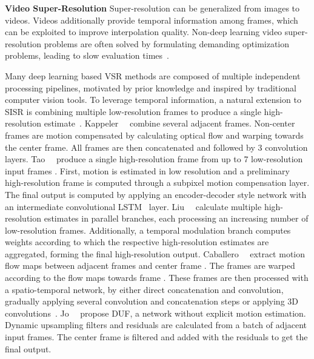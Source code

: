 \documentclass[10pt,twocolumn,letterpaper]{article}
\begin{document}
\noindent
\textbf{Video Super-Resolution}
\newline
Super-resolution can be generalized from images to videos. Videos additionally provide temporal information among frames, which can be exploited to improve interpolation quality. Non-deep learning video super-resolution problems are often solved by formulating demanding optimization problems, leading to slow evaluation times~\cite{belekos, farsiu, bayes}.

Many deep learning based VSR methods are composed of multiple independent processing pipelines, motivated by prior knowledge and inspired by traditional computer vision tools. To leverage temporal information, a natural extension to SISR is combining multiple low-resolution frames to produce a single high-resolution estimate~\cite{liao, endtoend, sparse_rep}. 
Kappeler~\etal~\cite{kappeler} combine several adjacent frames. Non-center frames are motion compensated by calculating optical flow and warping towards the center frame. All frames are then concatenated and followed by 3 convolution layers. 
Tao~\etal~\cite{tao} produce a single high-resolution frame  from up to 7 low-resolution input frames . First, motion is estimated in low resolution and a preliminary high-resolution frame is computed through a subpixel motion compensation layer. The final output is computed by applying an encoder-decoder style network with an intermediate convolutional LSTM~\cite{lstm} layer. 
Liu~\etal~\cite{liu} calculate multiple high-resolution estimates in parallel branches, each processing an increasing number of low-resolution frames. Additionally, a temporal modulation branch computes weights according to which the respective high-resolution estimates are aggregated, forming the final high-resolution output.
Caballero~\etal~\cite{caballero} extract motion flow maps between adjacent frames and center frame . The frames are warped according to the flow maps towards frame . These frames are then processed with a spatio-temporal network, by either direct concatenation and convolution, gradually applying several convolution and concatenation steps or applying 3D convolutions~\cite{3Dconv}.
Jo~\etal~\cite{duf} propose DUF, a network without explicit motion estimation. Dynamic upsampling filters and residuals are calculated from a batch of adjacent input frames. The center frame is filtered and added with the residuals to get the final output.
\end{document}
